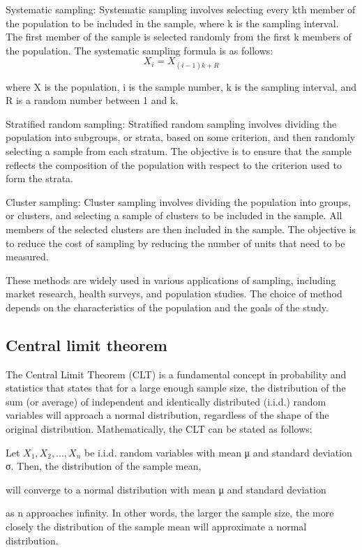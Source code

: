 \documentclass[12pt, a4paper, oneside]{article}
\begin{document}
Systematic sampling: Systematic sampling involves selecting every kth member of the population to be included in the sample, where k is the sampling interval. The first member of the sample is selected randomly from the first k members of the population. The systematic sampling formula is as follows:
$$ X_i = X_{(i-1)k + R} $$

where X is the population, i is the sample number, k is the sampling interval, and R is a random number between 1 and k.

Stratified random sampling: Stratified random sampling involves dividing the population into subgroups, or strata, based on some criterion, and then randomly selecting a sample from each stratum. The objective is to ensure that the sample reflects the composition of the population with respect to the criterion used to form the strata.

Cluster sampling: Cluster sampling involves dividing the population into groups, or clusters, and selecting a sample of clusters to be included in the sample. All members of the selected clusters are then included in the sample. The objective is to reduce the cost of sampling by reducing the number of units that need to be measured.

These methods are widely used in various applications of sampling, including market research, health surveys, and population studies. The choice of method depends on the characteristics of the population and the goals of the study.
\subsection{ Central limit theorem }
The Central Limit Theorem (CLT) is a fundamental concept in probability and statistics that states that for a large enough sample size, the distribution of the sum (or average) of independent and identically distributed (i.i.d.) random variables will approach a normal distribution, regardless of the shape of the original distribution. Mathematically, the CLT can be stated as follows:

Let $X_1, X_2, ..., X_n$ be i.i.d. random variables with mean μ and standard deviation σ. Then, the distribution of the sample mean,


will converge to a normal distribution with mean μ and standard deviation


as n approaches infinity. In other words, the larger the sample size, the more closely the distribution of the sample mean will approximate a normal distribution.
\end{document}
